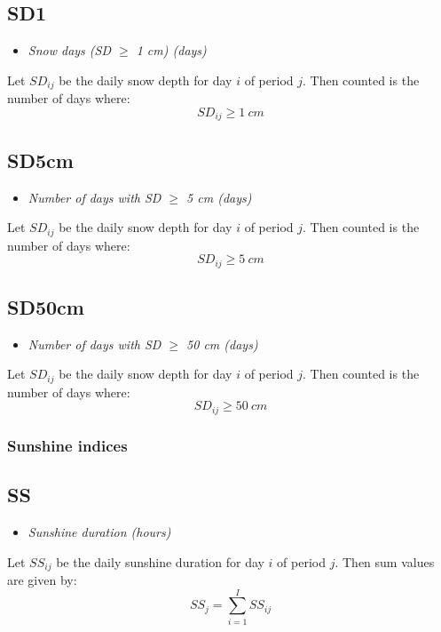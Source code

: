 \documentclass[a4paper,11pt]{article}
\begin{document}
\subsection*{SD1}
\begin{itemize}
\item \textit{Snow days (SD $\geq$ 1 cm) (days)}
\end{itemize}
Let $SD_{ij}$ be the daily snow depth for day $i$ of period
$j$. Then counted is the number of days where:
\begin{equation*}
SD_{ij} \geq 1~cm
\end{equation*}

\subsection*{SD5cm}
\begin{itemize}
\item \textit{Number of days with SD $\geq$ 5 cm (days)}
\end{itemize}
Let $SD_{ij}$ be the daily snow depth for day $i$ of period
$j$. Then counted is the number of days where:
\begin{equation*}
SD_{ij} \geq 5~cm
\end{equation*}

\subsection*{SD50cm}
\begin{itemize}
\item \textit{Number of days with SD $\geq$ 50 cm (days)}
\end{itemize}
Let $SD_{ij}$ be the daily snow depth for day $i$ of period
$j$. Then counted is the number of days where:
\begin{equation*}
SD_{ij} \geq 50~cm
\end{equation*}

\subsubsection{Sunshine indices}

\subsection*{SS}
\begin{itemize}
\item \textit{Sunshine duration (hours)}
\end{itemize}
Let $SS_{ij}$ be the daily sunshine duration for day $i$ of period
$j$. Then sum values are given by:
\begin{equation*}
SS_j = \sum_{i=1}^I{SS_{ij}}
\end{equation*}
\end{document}
